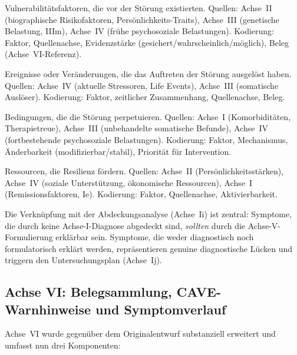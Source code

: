 \documentclass[11pt,a4paper]{article}
\begin{document}
\begin{description}[style=nextline, leftmargin=1.5cm, font=\bfseries]
\item[Pr\"adisponierende Faktoren (P1)] Vulnerabilit\"atsfaktoren, die vor der St\"orung existierten. Quellen: Achse~II (biographische Risikofaktoren, Pers\"onlichkeits-Traits), Achse~III (genetische Belastung, IIIm), Achse~IV (fr\"uhe psychosoziale Belastungen). Kodierung: Faktor, Quellenachse, Evidenzst\"arke (gesichert/wahrscheinlich/m\"oglich), Beleg (Achse~VI-Referenz).
\item[Ausl\"osende Faktoren (P2)] Ereignisse oder Ver\"anderungen, die das Auftreten der St\"orung ausgelöst haben. Quellen: Achse~IV (aktuelle Stressoren, Life Events), Achse~III (somatische Ausl\"oser). Kodierung: Faktor, zeitlicher Zusammenhang, Quellenachse, Beleg.
\item[Aufrechterhaltende Faktoren (P3)] Bedingungen, die die St\"orung perpetuieren. Quellen: Achse~I (Komorbidit\"aten, Therapietreue), Achse~III (unbehandelte somatische Befunde), Achse~IV (fortbestehende psychosoziale Belastungen). Kodierung: Faktor, Mechanismus, \"Anderbarkeit (modifizierbar/stabil), Priorit\"at f\"ur Intervention.
\item[Protektive Faktoren (P4)] Ressourcen, die Resilienz f\"ordern. Quellen: Achse~II (Pers\"onlichkeitsst\"arken), Achse~IV (soziale Unterst\"utzung, \"okonomische Ressourcen), Achse~I (Remissionsfaktoren, Ie). Kodierung: Faktor, Quellenachse, Aktivierbarkeit.
\end{description}

Die Verkn\"upfung mit der Abdeckungsanalyse (Achse~Ii) ist zentral: Symptome, die durch keine Achse-I-Diagnose abgedeckt sind, \textit{sollten} durch die Achse-V-Formulierung erkl\"arbar sein. Symptome, die weder diagnostisch noch formulatorisch erkl\"art werden, repr\"asentieren genuine diagnostische L\"ucken und triggern den Untersuchungsplan (Achse~Ij).

\subsection{Achse VI: Belegsammlung, CAVE-Warnhinweise und Symptomverlauf}

Achse~VI wurde gegen\"uber dem Originalentwurf substanziell erweitert und umfasst nun drei Komponenten:
\end{document}
